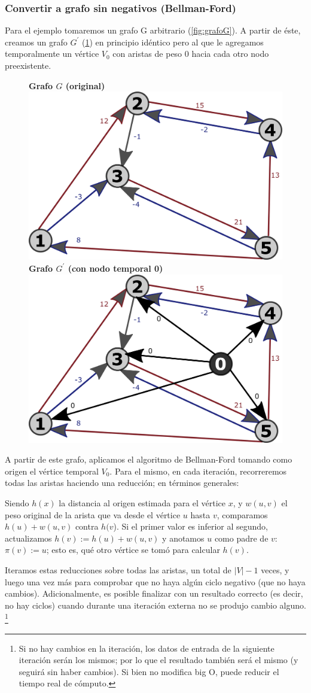\documentclass[../tp2_grupo404.tex]{subfiles}
\begin{document}
\subsubsection{Convertir a grafo sin negativos (Bellman-Ford)}\label{sec:parte1_4_1}
Para el ejemplo tomaremos un grafo G arbitrario (\cref{fig:grafoG}).
A partir de éste, creamos un grafo $G^\prime$ (\cref{fig:grafoG_prima})
en principio idéntico pero al que le agregamos temporalmente un
vértice $V_0$ con aristas de peso $0$ hacia cada otro nodo preexistente.

\begin{figure}[H]
    \centering
    \subcaptionbox
        {\label{fig:grafoG}\textbf{Grafo $G$ (original)}}
        {\includegraphics[width=0.4\linewidth,angle=0,origin=c]{out/ford/ford1A.png}}
    \subcaptionbox
        {\label{fig:grafoG_prima}\textbf{Grafo $G^\prime$ (con nodo temporal 0)}}
        {\includegraphics[width=0.4\linewidth,angle=0,origin=c]{out/ford/ford1B.png}}
\end{figure}

A partir de este grafo, aplicamos el algoritmo de Bellman-Ford tomando
como origen el vértice temporal $V_0$. Para el mismo, en cada iteración,
recorreremos todas las aristas haciendo una reducción;
en términos generales:
\begin{displayquote}
Siendo $h(x)$ la distancia al origen estimada para el vértice $x$,
y $w(u,v)$ el peso original de la arista que va desde el vértice $u$ hasta $v$,
comparamos $h(u)+w(u,v)$ contra $h(v$). Si el primer valor es inferior al
segundo, actualizamos $h(v) := h(u)+w(u,v)$ y anotamos $u$ como padre de $v$:
$\pi(v):=u$; esto es, qué otro vértice se tomó para calcular $h(v)$.
\end{displayquote}

Iteramos estas reducciones sobre todas las aristas, un total de
$\lvert V \rvert-1$ veces, y luego una vez más para comprobar que
no haya algún ciclo negativo (que no haya cambios). Adicionalmente,
es posible finalizar con un resultado correcto (es decir, no hay ciclos)
cuando durante una iteración externa no se produjo cambio alguno.
\footnote{Si no hay cambios en la iteración, los datos de entrada de
la siguiente iteración serán los mismos; por lo que el resultado también
será el mismo (y seguirá sin haber cambios). Si bien no modifica
big O, puede reducir el tiempo real de cómputo.}
\end{document}
